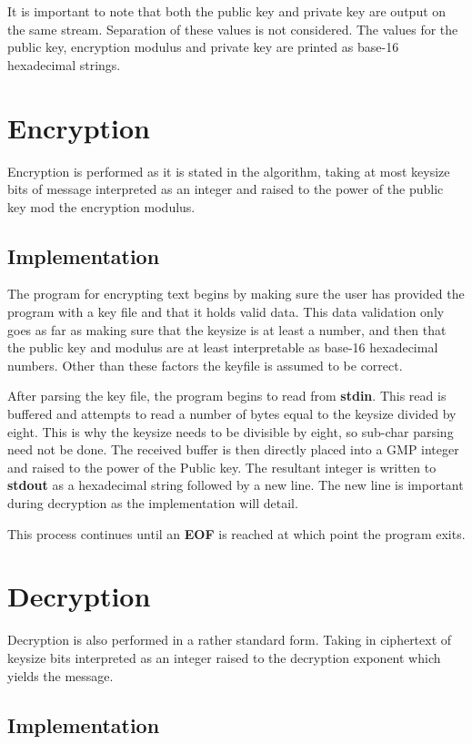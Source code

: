 It is important to note that both the public key and private key are output on the same stream. 
Separation of these values is not considered.
The values for the public key, encryption modulus and private key are printed as base-16 hexadecimal strings.

\section{ Encryption }

Encryption is performed as it is stated in the algorithm, taking at most keysize bits of message interpreted as an integer and raised to the power of the public key mod the encryption modulus.

\subsection{Implementation}

The program for encrypting text begins by making sure the user has provided the program with a key file and that it holds valid data.
This data validation only goes as far as making sure that the keysize is at least a number, and then that the public key and modulus are at least interpretable as base-16 hexadecimal numbers. 
Other than these factors the keyfile is assumed to be correct.

After parsing the key file, the program begins to read from \textbf{stdin}. 
This read is buffered and attempts to read a number of bytes equal to the keysize divided by eight.
This is why the keysize needs to be divisible by eight, so sub-char parsing need not be done.
The received buffer is then directly placed into a GMP integer and raised to the power of the Public key.
The resultant integer is written to \textbf{stdout} as a hexadecimal string followed by a new line.
The new line is important during decryption as the implementation will detail.

This process continues until an \textbf{EOF} is reached at which point the program exits.


\section{ Decryption }

Decryption is also performed in a rather standard form. Taking in ciphertext of keysize bits interpreted as an integer raised to the decryption exponent which yields the message.

\subsection{Implementation}

